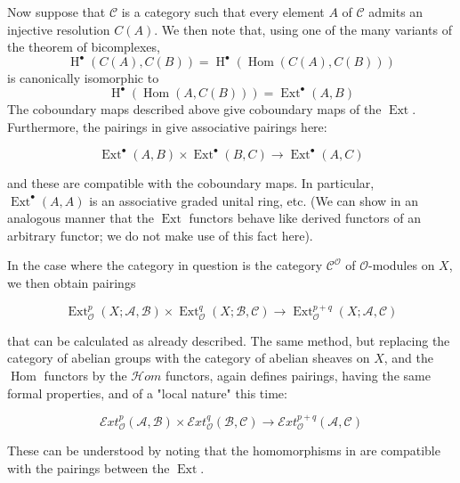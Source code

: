 Now suppose that $\mathcal{C}$ is a category such that every element $A$ of $\mathcal{C}$ admits an injective resolution $C(A)$.
We then note that, using one of the many variants of the theorem of bicomplexes,
\[\operatorname{H}^\bullet(C(A),C(B)) = \operatorname{H}^\bullet(\operatorname{Hom}(C(A),C(B)))\]
is canonically isomorphic to
\[\operatorname{H}^\bullet(\operatorname{Hom}(A,C(B))) = \operatorname{Ext}^\bullet(A,B)\]
The coboundary maps described above give coboundary maps of the $\operatorname{Ext}$.
Furthermore, the pairings in  give associative pairings here:

\begin{equation}\tag{2.3}\label{fga1-equation-2.3}
  \operatorname{Ext}^\bullet(A,B)\times\operatorname{Ext}^\bullet(B,C) \to \operatorname{Ext}^\bullet(A,C)
\end{equation}


and these are compatible with the coboundary maps.
In particular, $\operatorname{Ext}^\bullet(A,A)$ is an associative graded unital ring, etc.
(We can show in an analogous manner that the $\operatorname{Ext}$ functors behave like derived functors of an arbitrary functor;
we do not make use of this fact here).

In the case where the category in question is the category $\mathcal{C}^\mathcal{O}$ of $\mathcal{O}$-modules on $X$, we then obtain pairings


\begin{equation}\tag{2.4}\label{fga1-equation-2.4}
  \operatorname{Ext}_\mathcal{O}^p(X;\mathcal{A},\mathcal{B})\times\operatorname{Ext}_\mathcal{O}^q(X;\mathcal{B},\mathcal{C}) \to \operatorname{Ext}_\mathcal{O}^{p+q}(X;\mathcal{A},\mathcal{C})
\end{equation}


that can be calculated as already described.
The same method, but replacing the category of abelian groups with the category of abelian sheaves on $X$, and the $\operatorname{Hom}$ functors by the $\mathcal{H}om$ functors, again defines pairings, having the same formal properties, and of a "local nature" this time:

\begin{equation}\tag{2.5}\label{fga1-equation-2.5}
  \mathcal{E}xt_\mathcal{O}^p(\mathcal{A},\mathcal{B})\times\mathcal{E}xt_\mathcal{O}^q(\mathcal{B},\mathcal{C}) \to \mathcal{E}xt_\mathcal{O}^{p+q}(\mathcal{A},\mathcal{C})
\end{equation}


These can be understood by noting that the homomorphisms in  are compatible with the pairings between the $\operatorname{Ext}$.

